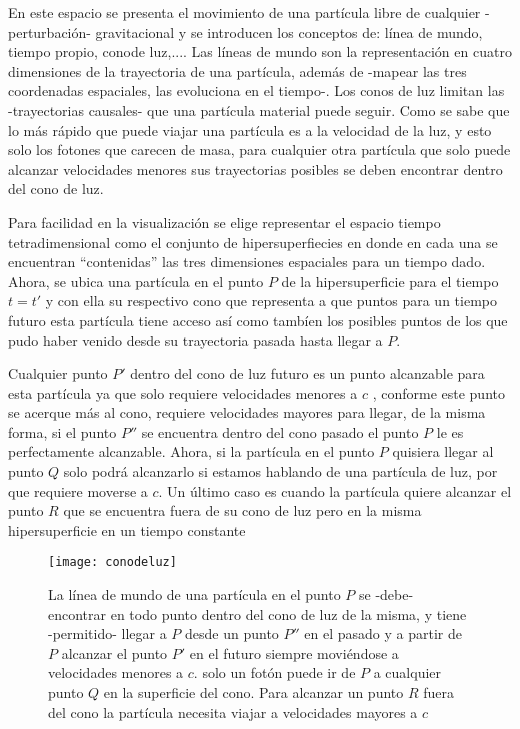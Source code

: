 \documentclass[11pt]{book}
\begin{document}
En este espacio se presenta el movimiento de una partícula libre de cualquier -perturbación- gravitacional y se introducen los conceptos de: línea de mundo, tiempo propio, conode luz,.... Las líneas de mundo son la representación en cuatro dimensiones de la trayectoria de una partícula, además de -mapear las tres coordenadas espaciales, las evoluciona en el tiempo-. %
Los conos de luz limitan las -trayectorias causales- que una partícula material puede seguir. Como se sabe que lo más rápido que puede viajar una partícula es a la velocidad de la luz, y esto solo los fotones que carecen de masa, para cualquier otra partícula que solo puede alcanzar velocidades menores sus trayectorias posibles se deben encontrar dentro del cono de luz. 

Para facilidad en la visualización se elige representar el espacio tiempo tetradimensional como el conjunto de hipersuperfiecies en donde en cada una se encuentran ``contenidas'' las tres dimensiones espaciales para un tiempo dado. Ahora, se ubica una partícula en el punto $P$ de la hipersuperficie para el tiempo $t=t'$ y con ella su respectivo cono que representa a que puntos para un tiempo futuro esta partícula tiene acceso así como tambíen los posibles puntos de los que pudo haber venido desde su trayectoria pasada hasta llegar a $P$.

Cualquier punto $P'$ dentro del cono de luz futuro es un punto alcanzable para esta partícula ya que solo requiere velocidades menores a $c$ , conforme este punto se acerque más al cono, requiere velocidades mayores para llegar, de la misma forma, si el punto $P''$ se encuentra dentro del cono pasado el punto $P$ le es perfectamente alcanzable.
Ahora, si la partícula en el punto $P$ quisiera llegar al punto $Q$ solo podrá alcanzarlo si estamos hablando de una partícula de luz, por que requiere moverse a $c$. Un último caso es cuando la partícula quiere alcanzar el punto $R$ que se encuentra fuera de su cono de luz pero en la misma hipersuperficie en un tiempo constante
\begin{figure}[h!]
\centering
\texttt{[image: conodeluz]}
\caption{ La línea de mundo de una partícula en el punto $P$ se -debe- encontrar en todo punto dentro del cono de luz de la misma, y tiene -permitido- llegar a $P$ desde un punto $P''$ en el pasado y a partir de $P$ alcanzar el punto $P'$ en el futuro siempre moviéndose a velocidades menores a $c$. solo un fotón puede ir de $P$ a  cualquier punto $Q$ en la superficie del cono. Para alcanzar un punto $R$ fuera del cono la partícula necesita viajar a velocidades mayores a $c$}
\label{conodeluz}
\end{figure}
\end{document}

